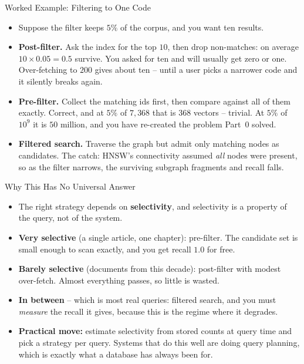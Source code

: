 \begin{frame}{Worked Example: Filtering to One Code}
\begin{itemize}
  \item Suppose the filter keeps $5\%$ of the corpus, and you want ten results.
  \pause
  \item \textbf{Post-filter.} Ask the index for the top $10$, then drop non-matches: on average $10 \times 0.05 = 0.5$ survive. You asked for ten and will usually get zero or one. Over-fetching to $200$ gives about ten -- until a user picks a narrower code and it silently breaks again.
  \pause
  \item \textbf{Pre-filter.} Collect the matching ids first, then compare against all of them exactly. Correct, and at $5\%$ of $7{,}368$ that is $368$ vectors -- trivial. At $5\%$ of $10^9$ it is $50$ million, and you have re-created the problem Part~0 solved.
  \pause
  \item \textbf{Filtered search.} Traverse the graph but admit only matching nodes as candidates. The catch: HNSW's connectivity assumed \emph{all} nodes were present, so as the filter narrows, the surviving subgraph fragments and recall falls.
\end{itemize}
\end{frame}

\begin{frame}{Why This Has No Universal Answer}
\begin{itemize}
  \item The right strategy depends on \textbf{selectivity}, and selectivity is a property of the query, not of the system.
  \pause
  \item \textbf{Very selective} (a single article, one chapter): pre-filter. The candidate set is small enough to scan exactly, and you get recall $1.0$ for free.
  \pause
  \item \textbf{Barely selective} (documents from this decade): post-filter with modest over-fetch. Almost everything passes, so little is wasted.
  \pause
  \item \textbf{In between} -- which is most real queries: filtered search, and you must \emph{measure} the recall it gives, because this is the regime where it degrades.
  \pause
  \item \textbf{Practical move:} estimate selectivity from stored counts at query time and pick a strategy per query. Systems that do this well are doing query planning, which is exactly what a database has always been for.
\end{itemize}
\end{frame}

